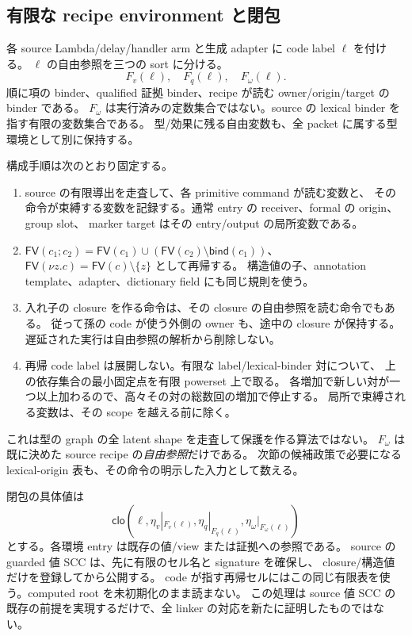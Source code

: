 \documentclass[11pt,a4paper]{article}
\begin{document}
\subsection{有限な recipe environment と閉包}

各 source Lambda/delay/handler arm と生成 adapter に code label \(\ell\) を付ける。
\(\ell\) の自由参照を三つの sort に分ける。
\[
 F_v(\ell),\quad F_q(\ell),\quad F_\omega(\ell).
 \tag{C-Free}
\]
順に項の binder、qualified 証拠 binder、recipe が読む owner/origin/target の binder である。
\(F_\omega\) は実行済みの定数集合ではない。source の lexical binder を指す有限の変数集合である。
型/効果に残る自由変数も、全 packet に属する型環境として別に保持する。

構成手順は次のとおり固定する。
\begin{enumerate}
\item source の有限導出を走査して、各 primitive command が読む変数と、
その命令が束縛する変数を記録する。通常 entry の receiver、formal の origin、group slot、
marker target はその entry/output の局所変数である。
\item \(\mathsf{FV}(c_1;c_2)=\mathsf{FV}(c_1)\cup
(\mathsf{FV}(c_2)\setminus\mathsf{bind}(c_1))\)、
\(\mathsf{FV}(\nu z.c)=\mathsf{FV}(c)\setminus\{z\}\) として再帰する。
構造値の子、annotation template、adapter、dictionary field にも同じ規則を使う。
\item 入れ子の closure を作る命令は、その closure の自由参照を読む命令でもある。
従って孫の code が使う外側の owner も、途中の closure が保持する。
遅延された実行は自由参照の解析から削除しない。
\item 再帰 code label は展開しない。有限な label/lexical-binder 対について、
上の依存集合の最小固定点を有限 powerset 上で取る。
各増加で新しい対が一つ以上加わるので、高々その対の総数回の増加で停止する。
局所で束縛される変数は、その scope を越える前に除く。
\end{enumerate}
これは型の graph の全 latent shape を走査して保護を作る算法ではない。
\(F_\omega\) は既に決めた source recipe の\emph{自由参照}だけである。
次節の候補政策で必要になる lexical-origin 表も、その命令の明示した入力として数える。

閉包の具体値は
\[
 \mathsf{clo}(\ell,\eta_v|_{F_v(\ell)},
                    \eta_q|_{F_q(\ell)},\eta_\omega|_{F_\omega(\ell)})
 \tag{C-Close}
\]
とする。各環境 entry は既存の値/view または証拠への参照である。
source の guarded 値 SCC は、先に有限のセル名と signature を確保し、
closure/構造値だけを登録してから公開する。
code が指す再帰セルにはこの同じ有限表を使う。computed root を未初期化のまま読まない。
この処理は source 値 SCC の既存の前提を実現するだけで、全 linker の対応を新たに証明したものではない。
\end{document}
